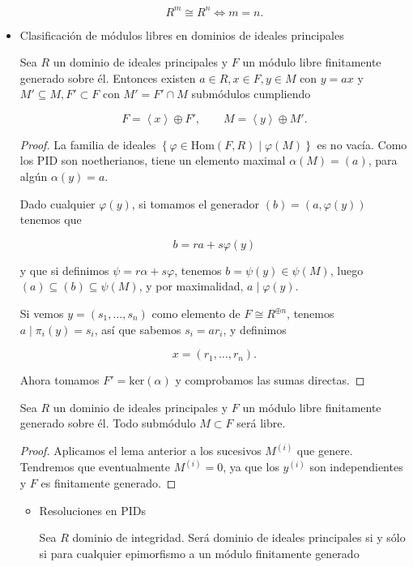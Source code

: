 \documentclass[11pt]{article}
\begin{document}
\begin{itemize}
\begin{corollary}
\[
R^m \cong R^n \iff m = n.
\]
\end{corollary}

\item Clasificación de módulos libres en dominios de ideales principales
\label{sec-7-5-3-5}
\begin{lemma}
Sea $R$ un dominio de ideales principales y $F$ un módulo libre finitamente
generado sobre él. Entonces existen $a\in R, x\in F, y\in M$ con $y = ax$ y
$M' \subseteq M,F' \subset F$ con $M' = F' \cap M$ submódulos cumpliendo

\[
F = \left\langle x \right\rangle \oplus F',
\qquad
M = \left\langle y \right\rangle \oplus M'.
\]
\end{lemma}

\begin{proof}
La familia de ideales $\left\{ \varphi \in \mathrm{Hom}(F,R) \mid \varphi(M) \right\}$ es no vacía. Como los PID son
noetherianos, tiene un elemento maximal $\alpha(M) = (a)$, para algún $\alpha(y) = a$.

Dado cualquier $\varphi(y)$, si tomamos el generador $(b) = (a,\varphi(y))$ tenemos que

\[
b = ra + s\varphi(y)
\]

y que si definimos $\psi = r\alpha + s\varphi$, tenemos $b = \psi(y) \in \psi(M)$, luego
$(a) \subseteq (b) \subseteq \psi(M)$, y por maximalidad, $a \mid \varphi(y)$.

Si vemos $y = \left( s_1,\dots,s_n \right)$ como elemento de $F\cong R^{\oplus n}$, tenemos $a \mid \pi_i(y) = s_i$,
así que sabemos $s_i = ar_i$, y definimos

\[
x = \left( r_1,\dots,r_n \right).
\]

Ahora tomamos $F' = \mathrm{ker}(\alpha)$ y comprobamos las sumas directas.
\end{proof}

\begin{proposition}
Sea $R$ un dominio de ideales principales y $F$ un módulo libre finitamente
generado sobre él. Todo submódulo $M \subset F$ será libre.
\end{proposition}

\begin{proof}
Aplicamos el lema anterior a los sucesivos $M^{(i)}$ que genere. Tendremos
que eventualmente $M^{(i)} = 0$, ya que los $y^{(i)}$ son independientes y $F$ es
finitamente generado.
\end{proof}

\begin{itemize}
\item Resoluciones en PIDs
\label{sec-7-5-3-5-1}
\begin{proposition}
Sea $R$ dominio de integridad. Será dominio de ideales principales si y sólo
si para cualquier epimorfismo a un módulo finitamente generado


\end{proposition}
\end{itemize}
\end{itemize}
\end{document}
